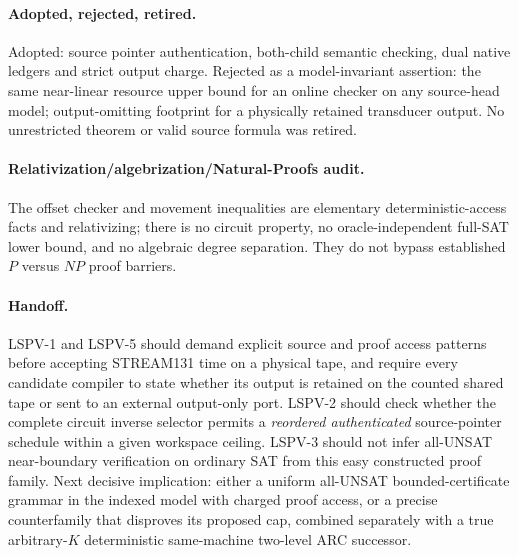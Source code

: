 \documentclass[11pt]{article}
\begin{document}
\paragraph{Adopted, rejected, retired.} Adopted: source pointer authentication, both-child semantic checking, dual native ledgers and strict output charge. Rejected as a model-invariant assertion: the same near-linear resource upper bound for an online checker on any source-head model; output-omitting footprint for a physically retained transducer output. No unrestricted theorem or valid source formula was retired.
\paragraph{Relativization/algebrization/Natural-Proofs audit.} The offset checker and movement inequalities are elementary deterministic-access facts and relativizing; there is no circuit property, no oracle-independent full-SAT lower bound, and no algebraic degree separation. They do not bypass established $P$ versus $NP$ proof barriers.
\paragraph{Handoff.} LSPV-1 and LSPV-5 should demand explicit source and proof access patterns before accepting STREAM131 time on a physical tape, and require every candidate compiler to state whether its output is retained on the counted shared tape or sent to an external output-only port. LSPV-2 should check whether the complete circuit inverse selector permits a \emph{reordered authenticated} source-pointer schedule within a given workspace ceiling. LSPV-3 should not infer all-UNSAT near-boundary verification on ordinary SAT from this easy constructed proof family. Next decisive implication: either a uniform all-UNSAT bounded-certificate grammar in the indexed model with charged proof access, or a precise counterfamily that disproves its proposed cap, combined separately with a true arbitrary-$K$ deterministic same-machine two-level ARC successor.
\end{document}
